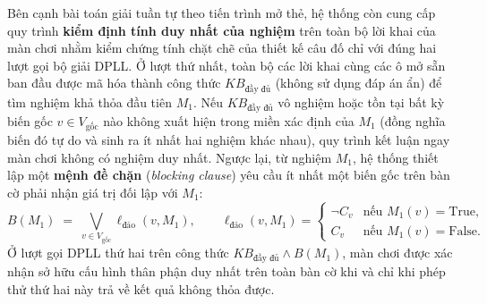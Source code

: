 Bên cạnh bài toán giải tuần tự theo tiến trình mở thẻ, hệ thống còn cung cấp quy
trình \textbf{kiểm định tính duy nhất của nghiệm} trên toàn bộ lời khai của màn
chơi nhằm kiểm chứng tính chặt chẽ của thiết kế câu đố chỉ với đúng hai lượt gọi
bộ giải DPLL. Ở lượt thứ nhất, toàn bộ các lời khai cùng các ô mở sẵn ban đầu được
mã hóa thành công thức $KB_{\text{đầy đủ}}$ (không sử dụng đáp án ẩn) để tìm
nghiệm khả thỏa đầu tiên $M_1$. Nếu $KB_{\text{đầy đủ}}$ vô nghiệm hoặc tồn tại
bất kỳ biến gốc $v \in V_{\text{gốc}}$ nào không xuất hiện trong miền xác định của
$M_1$ (đồng nghĩa biến đó tự do và sinh ra ít nhất hai nghiệm khác nhau), quy
trình kết luận ngay màn chơi không có nghiệm duy nhất. Ngược lại, từ nghiệm $M_1$,
hệ thống thiết lập một \textbf{mệnh đề chặn} (\textit{blocking clause}) yêu cầu ít
nhất một biến gốc trên bàn cờ phải nhận giá trị đối lập với $M_1$:
\begin{equation}
    B(M_1) \;=\; \bigvee_{v \in V_{\text{gốc}}} \ell_{\text{đảo}}(v, M_1), \qquad
    \ell_{\text{đảo}}(v, M_1) =
    \begin{cases}
        \neg C_v & \text{nếu } M_1(v) = \text{True}, \\
        C_v      & \text{nếu } M_1(v) = \text{False}.
    \end{cases}
    \label{eq:blocking_clause}
\end{equation}
Ở lượt gọi DPLL thứ hai trên công thức $KB_{\text{đầy đủ}} \wedge B(M_1)$, màn
chơi được xác nhận sở hữu cấu hình thân phận duy nhất trên toàn bàn cờ khi và chỉ
khi phép thử thứ hai này trả về kết quả không thỏa được.
